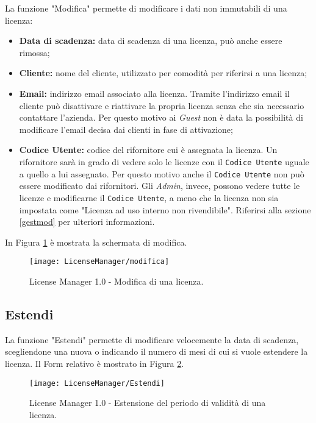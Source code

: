 La funzione "Modifica" permette di modificare i dati non immutabili di una licenza:
\begin{itemize}
\item \textbf{Data di scadenza:} data di scadenza di una licenza, può anche essere rimossa;
\item \textbf{Cliente:} nome del cliente, utilizzato per comodità per riferirsi a una licenza;
\item \textbf{Email:} indirizzo email associato alla licenza. Tramite l’indirizzo email il cliente può disattivare e riattivare la propria licenza senza che sia necessario contattare l’azienda. Per questo motivo ai \textit{Guest} non è data la possibilità di modificare l’email decisa dai clienti in fase di attivazione;
\item \textbf{Codice Utente:} codice del rifornitore cui è assegnata la licenza. Un rifornitore sarà in grado di vedere solo le licenze con il \texttt{Codice Utente} uguale a quello a lui assegnato. Per questo motivo anche il \texttt{Codice Utente} non può essere modificato dai rifornitori.
Gli \textit{Admin}, invece, possono vedere tutte le licenze e modificarne il \texttt{Codice Utente}, a meno che la licenza non sia impostata come "Licenza ad uso interno non rivendibile". Riferirsi alla sezione \ref{gestmod} per ulteriori informazioni.
\end{itemize} 

In Figura \ref{modifica} è mostrata la schermata di modifica.

\begin{figure}[!h] 
    \centering 
    \texttt{[image: LicenseManager/modifica]} 
    \caption{License Manager 1.0 - Modifica di una licenza.}
\label{modifica}
\end{figure}

\newpage
\subsection{Estendi}
La funzione "Estendi" permette di modificare velocemente la data di scadenza, scegliendone una nuova o indicando il numero di mesi di cui si vuole estendere la licenza.
Il Form relativo è mostrato in Figura \ref{estendi}.

\begin{figure}[!h] 
    \centering 
    \texttt{[image: LicenseManager/Estendi]} 
    \caption{License Manager 1.0 - Estensione del periodo di validità di una licenza.}
\label{estendi}
\end{figure}

